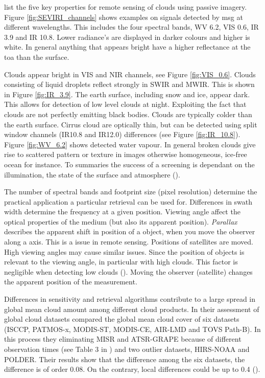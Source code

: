 \citeauthor{Karlsson2015AdvancingData} list the five key properties for remote sensing of clouds using passive imagery. Figure \ref{fig:SEVIRI_channels} shows examples on signals detected by \acrshort{msg} at different wavelengths. This includes the four spectral bands, WV 6.2, VIS 0.6, IR 3.9 and IR 10.8. Lower radiance's are displayed in darker colours and higher is white. In general anything that appears bright have a higher reflectance at the \acrfull{toa} than the surface. 

Clouds appear bright in VIS and NIR channels, see Figure \ref{fig:VIS_0.6}. Clouds consisting of liquid droplets reflect strongly in SWIR and MWIR. This is shown in Figure \ref{fig:IR_3.9}. The earth surface, including snow and ice, appear dark. This allows for detection of low level clouds at night. Exploiting the fact that clouds are not perfectly emitting black bodies. Clouds are typically colder than the earth surface. Cirrus cloud are optically thin, but can be detected using split window channels (IR10.8 and IR12.0) differences (see Figure \ref{fig:IR_10.8}). Figure \ref{fig:WV_6.2} shows detected water vapour. In general broken clouds give rise to scattered pattern or texture in images otherwise homogeneous, ice-free ocean for instance. To summaries the success of a screening is dependant on the illumination, the state of the surface and atmosphere (\cite{Karlsson2015AdvancingData}).  

The number of spectral bands and footprint size (pixel resolution) determine the practical application a particular retrieval can be used for. Differences in swath width determine the frequency at a given position. Viewing angle affect the optical properties of the medium (but also its apparent position). \textit{Parallax} describes the apparent shift in position of a object, when you move the observer along a axis. This is a issue in remote sensing. Positions of satellites are moved. High viewing angles may cause similar issues. Since the position of objects is relevant to the viewing angle, in particular with high clouds. This factor is negligible when detecting low clouds (\cite{Joro2010ComparisonFinland}). Moving the observer (satellite) changes the apparent position of the measurement. 

Differences in sensitivity and retrieval algorithms contribute to a large spread in global mean cloud amount among different cloud products. In their assessment of global cloud datasets \citeauthor{Stubenrauch2013AssessmentPanel} compared the global mean cloud cover of six datasets (ISCCP, PATMOS-x, MODIS-ST, MODIS-CE, AIR-LMD and TOVS Path-B). In this process they eliminating MISR and ATSR-GRAPE because of different observation times (see Table 3 in \cite{Stubenrauch2013AssessmentPanel} ) and two outlier datasets, HIRS-NOAA and POLDER. Their results show that the difference among the six datasets, the difference is of order 0.08. On the contrary, local differences could be up to 0.4 (\cite{Stubenrauch2013AssessmentPanel}). 

